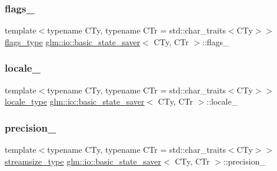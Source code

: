 \subsubsection{\texorpdfstring{flags\+\_\+}{flags\_}}
{\footnotesize\ttfamily template$<$typename C\+Ty, typename C\+Tr = std\+::char\+\_\+traits$<$\+C\+Ty$>$$>$ \\
\hyperlink{classglm_1_1io_1_1basic__state__saver_a73ca8320543524c7ab7f1ce97d30aff6}{flags\+\_\+type} \hyperlink{classglm_1_1io_1_1basic__state__saver}{glm\+::io\+::basic\+\_\+state\+\_\+saver}$<$ C\+Ty, C\+Tr $>$\+::flags\+\_\+\hspace{0.3cm}{\ttfamily [private]}}

\mbox{\label{classglm_1_1io_1_1basic__state__saver_a108385f01212b427ebae048eaf181e0d}} 
\subsubsection{\texorpdfstring{locale\+\_\+}{locale\_}}
{\footnotesize\ttfamily template$<$typename C\+Ty, typename C\+Tr = std\+::char\+\_\+traits$<$\+C\+Ty$>$$>$ \\
\hyperlink{classglm_1_1io_1_1basic__state__saver_acc657f13df9c1fd68e1014b96ff615cb}{locale\+\_\+type} \hyperlink{classglm_1_1io_1_1basic__state__saver}{glm\+::io\+::basic\+\_\+state\+\_\+saver}$<$ C\+Ty, C\+Tr $>$\+::locale\+\_\+\hspace{0.3cm}{\ttfamily [private]}}

\mbox{\label{classglm_1_1io_1_1basic__state__saver_a1b442206b28b324603599175285fb55a}} 
\subsubsection{\texorpdfstring{precision\+\_\+}{precision\_}}
{\footnotesize\ttfamily template$<$typename C\+Ty, typename C\+Tr = std\+::char\+\_\+traits$<$\+C\+Ty$>$$>$ \\
\hyperlink{classglm_1_1io_1_1basic__state__saver_a0a4c44df9a4fcf7531af6da7698e0931}{streamsize\+\_\+type} \hyperlink{classglm_1_1io_1_1basic__state__saver}{glm\+::io\+::basic\+\_\+state\+\_\+saver}$<$ C\+Ty, C\+Tr $>$\+::precision\+\_\+\hspace{0.3cm}{\ttfamily [private]}}

